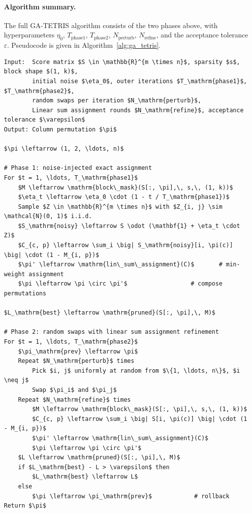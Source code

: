 \paragraph{Algorithm summary.}
The full GA-TETRIS algorithm consists of the two phases above, with hyperparameters $\eta_0$, $T_\mathrm{phase1}$, $T_\mathrm{phase2}$, $N_\mathrm{perturb}$, $N_\mathrm{refine}$, and the acceptance tolerance $\varepsilon$. Pseudocode is given in Algorithm~\ref{alg:ga_tetris}.

\begin{lstlisting}[style=pseudocode,
                   caption={GA-TETRIS},
                   label={alg:ga_tetris}]
Input:  Score matrix $S \in \mathbb{R}^{m \times n}$, sparsity $s$, block shape $(1, k)$,
        initial noise $\eta_0$, outer iterations $T_\mathrm{phase1}$, $T_\mathrm{phase2}$,
        random swaps per iteration $N_\mathrm{perturb}$, 
        Linear sum assignment rounds $N_\mathrm{refine}$, acceptance tolerance $\varepsilon$
Output: Column permutation $\pi$

$\pi \leftarrow (1, 2, \ldots, n)$

# Phase 1: noise-injected exact assignment
For $t = 1, \ldots, T_\mathrm{phase1}$
    $M \leftarrow \mathrm{block\_mask}(S[:, \pi],\, s,\, (1, k))$
    $\eta_t \leftarrow \eta_0 \cdot (1 - t / T_\mathrm{phase1})$
    Sample $Z \in \mathbb{R}^{m \times n}$ with $Z_{i, j} \sim \mathcal{N}(0, 1)$ i.i.d.
    $S_\mathrm{noisy} \leftarrow S \odot (\mathbf{1} + \eta_t \cdot Z)$
    $C_{c, p} \leftarrow \sum_i \big| S_\mathrm{noisy}[i, \pi(c)] \big| \cdot (1 - M_{i, p})$
    $\pi' \leftarrow \mathrm{lin\_sum\_assignment}(C)$       # min-weight assignment
    $\pi \leftarrow \pi \circ \pi'$                  # compose permutations

$L_\mathrm{best} \leftarrow \mathrm{pruned}(S[:, \pi],\, M)$

# Phase 2: random swaps with linear sum assignment refinement
For $t = 1, \ldots, T_\mathrm{phase2}$
    $\pi_\mathrm{prev} \leftarrow \pi$
    Repeat $N_\mathrm{perturb}$ times
        Pick $i, j$ uniformly at random from $\{1, \ldots, n\}$, $i \neq j$
        Swap $\pi_i$ and $\pi_j$
    Repeat $N_\mathrm{refine}$ times
        $M \leftarrow \mathrm{block\_mask}(S[:, \pi],\, s,\, (1, k))$
        $C_{c, p} \leftarrow \sum_i \big| S[i, \pi(c)] \big| \cdot (1 - M_{i, p})$
        $\pi' \leftarrow \mathrm{lin\_sum\_assignment}(C)$
        $\pi \leftarrow \pi \circ \pi'$
    $L \leftarrow \mathrm{pruned}(S[:, \pi],\, M)$
    if $L_\mathrm{best} - L > \varepsilon$ then
        $L_\mathrm{best} \leftarrow L$
    else
        $\pi \leftarrow \pi_\mathrm{prev}$            # rollback
Return $\pi$
\end{lstlisting}

